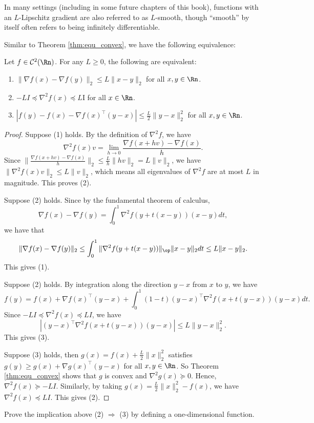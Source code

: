 In many settings (including in some future chapters of this book),
functions with an $L$-Lipschitz gradient are also referred to as
$L$-smooth, though ``smooth'' by itself often refers to being infinitely
differentiable. 

Similar to Theorem \ref{thm:equ_convex}, we have the following equivalence:
\begin{thm}
\label{thm:L_equ_def}Let $f\in\mathcal{C}^{2}(\Rn)$. For any $L\geq0$,
the following are equivalent:
\begin{enumerate}
\item $\|\nabla f(x)-\nabla f(y)\|_{2}\leq L\|x-y\|_{2}$ for all $x,y\in\Rn$.
\item $-LI\preceq\nabla^{2}f(x)\preceq L$I for all $x\in\Rn$.
\item $\left|f(y)-f(x)-\nabla f(x)^{\top}(y-x)\right|\le\frac{L}{2}\|y-x\|_{2}^{2}$
for all $x,y\in\Rn$.
\end{enumerate}
\end{thm}

\begin{proof}
Suppose (1) holds. By the definition of $\nabla^{2}f$, we have
\[
\nabla^{2}f(x)v=\lim_{h\rightarrow0}\frac{\nabla f(x+hv)-\nabla f(x)}{h}.
\]
Since $\|\frac{\nabla f(x+hv)-\nabla f(x)}{h}\|_{2}\leq\frac{L}{h}\|hv\|_{2}=L\|v\|_{2}$,
we have $\|\nabla^{2}f(x)v\|_{2}\leq L\|v\|_{2}$, which means all
eigenvalues of $\nabla^{2}f$ are at most $L$ in magnitude. This
proves (2).

Suppose (2) holds. Since by the fundamental theorem of calculus, 
\[
\nabla f(x)-\nabla f(y)=\int_{0}^{1}\nabla^{2}f(y+t(x-y))(x-y)dt,
\]
we have that
\[
\|\nabla f(x)-\nabla f(y)\|_{2}\leq\int_{0}^{1}\|\nabla^{2}f(y+t(x-y))\|_{\op}\|x-y\|_{2}dt\leq L\|x-y\|_{2}.
\]
This gives (1).

Suppose (2) holds. By integration along the direction $y-x$ from
$x$ to $y$, we have
\[
f(y)=f(x)+\nabla f(x)^{\top}(y-x)+\int_{0}^{1}(1-t)(y-x)^{\top}\nabla^{2}f(x+t(y-x))(y-x)dt.
\]
Since $-LI\preceq\nabla^{2}f(x)\preceq LI$, we have
\[
\left|(y-x)^{\top}\nabla^{2}f(x+t(y-x))(y-x)\right|\le L\|y-x\|_{2}^{2}.
\]
This gives (3).

Suppose (3) holds, then $g(x)=f(x)+\frac{L}{2}\|x\|_{2}^{2}$ satisfies
$g(y)\geq g(x)+\nabla g(x)^{\top}(y-x)$ for all $x,y\in\Rn$. So
Theorem \ref{thm:equ_convex} shows that $g$ is convex and $\nabla^{2}g(x)\succeq0$.
Hence, $\nabla^{2}f(x)\succeq-LI$. Similarly, by taking $g(x)=\frac{L}{2}\|x\|_{2}^{2}-f(x)$,
we have $\nabla^{2}f(x)\preceq LI$. This gives (2).
\end{proof}
\begin{xca}
Prove the implication above (2) $\Rightarrow$ (3) by defining a one-dimensional
function. 
\end{xca}


